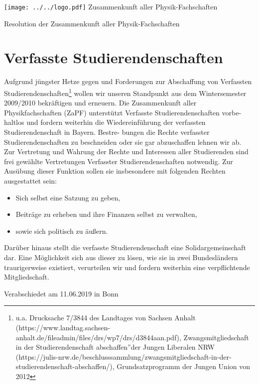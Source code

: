 \documentclass[DIV=calc]{scrartcl}
\begin{document}
    \hspace{0.87\textwidth}
    \begin{minipage}{120pt}
        \vspace{-1.8cm}
        \texttt{[image: ../../logo.pdf]}
        \centering
        \small Zusammenkunft aller Physik-Fachschaften
    \end{minipage}
    \begin{center}
        \huge{Resolution der Zusammenkunft aller Physik-Fachschaften}\vspace{.25\baselineskip}\\
        \normalsize
    \end{center}
    \vspace{1cm}

\section*{Verfasste Studierendenschaften}
Aufgrund jüngster Hetze gegen und Forderungen zur Abschaffung von Verfassten Studierendenschaften\footnote{u.a. Drucksache 7/3844 des Landtages von Sachsen Anhalt (https://www.landtag.sachsen-anhalt.de/fileadmin/files/drs/wp7/drs/d3844aan.pdf), Zwangsmitgliedschaft in der Studierendenschaft abschaffen”der Jungen Liberalen NRW (https://julis-nrw.de/beschlusssammlung/zwangsmitgliedschaft-in-der-studierendenschaft-abschaffen/), Grundsatzprogramm der Jungen Union von 2012} wollen wir unseren Standpunkt aus dem Wintersemester 2009/2010 bekräftigen und erneuern.
Die Zusammenkunft aller Physikfachschaften (ZaPF) unterstützt Verfasste Studierendenschaften vorbe-
haltlos und fordern weiterhin die Wiedereinführung der verfassten Studierendenschaft in Bayern. Bestre-
bungen die Rechte verfasster Studierendenschaften zu beschneiden oder sie gar abzuschaffen lehnen wir
ab.\\
Zur Vertretung und Wahrung der Rechte und Interessen aller Studierenden sind frei gewählte Vertretungen
Verfasster Studierendenschaften notwendig. Zur Ausübung dieser Funktion sollen sie insbesondere mit
folgenden Rechten ausgestattet sein:\\
\begin{itemize}
\item Sich selbst eine Satzung zu geben,
\item Beiträge zu erheben und ihre Finanzen selbst zu verwalten,
\item sowie sich politisch zu äußern.
\end{itemize}
Darüber hinaus stellt die verfasste Studierendenschaft eine Solidargemeinschaft dar. Eine Möglichkeit sich
aus dieser zu lösen, wie sie in zwei Bundesländern traurigerweise existiert, verurteilen wir und fordern
weiterhin eine verpflichtende Mitgliedschaft.\\


\vspace*{\fill}
\begin{flushright}
Verabschiedet am 11.06.2019 in Bonn
\end{flushright}
\end{document}
